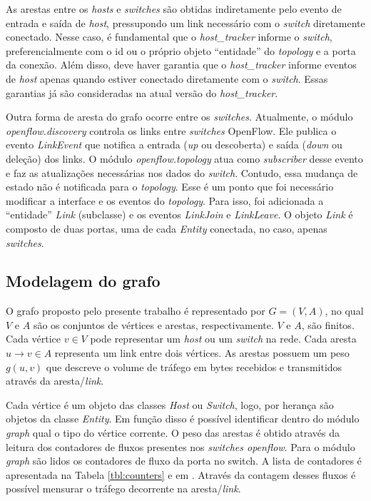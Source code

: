 As arestas entre os \emph{hosts} e \emph{switches} são obtidas
indiretamente pelo evento de entrada e saída de \emph{host},
pressupondo um link necessário com o \emph{switch} diretamente conectado.
Nesse caso, é fundamental que o \emph{host\_tracker} informe 
o \emph{switch}, preferencialmente com o id 
ou o próprio objeto ``entidade'' do \emph{topology} e a porta da conexão.
Além disso, deve haver garantia que o \emph{host\_tracker} 
informe eventos de \emph{host} apenas quando estiver conectado
diretamente com o \emph{switch}.
Essas garantias já são consideradas na atual versão do \emph{host\_tracker}.

Outra forma de aresta do grafo ocorre entre os \emph{switches}.
Atualmente, o módulo \emph{openflow.discovery} controla os 
links entre \emph{switches} OpenFlow. 
Ele publica o evento \emph{LinkEvent} que notifica 
a entrada ({\it up} ou descoberta) e saída ({\it down} ou deleção)
dos links.
O módulo \emph{openflow.topology} atua como {\it subscriber} desse evento
e faz as atualizações necessárias nos dados do \emph{switch}.
Contudo, essa mudança de estado não é notificada para o \emph{topology}.
Esse é um ponto que foi necessário modificar a interface e os
eventos do \emph{topology}.
Para isso, foi adicionada a ``entidade'' \emph{Link} (subclasse) e
os eventos \emph{LinkJoin} e \emph{LinkLeave}.
O objeto \emph{Link} é composto de duas portas,
uma de cada \emph{Entity} conectada,
no caso, apenas \emph{switches}.


\subsection{Modelagem do grafo}
O grafo proposto pelo presente trabalho é representado por
$G=(V,A)$, no qual $V$ e $A$ são os conjuntos de vértices e arestas, respectivamente. 
 $V$ e $A$, são finitos.
Cada vértice $v \in V$ pode representar um \emph{host} ou um
\emph{switch} na rede. 
Cada aresta $u \to v \in A$ representa um link entre dois vértices.
As arestas possuem um peso $g(u, v)$ que descreve o volume de 
tráfego em bytes recebidos e transmitidos através da aresta/\emph{link}. 

Cada vértice é um objeto das classes \emph{Host} ou \emph{Switch},
logo, por herança são objetos da classe \emph{Entity}. 
Em função disso é possível identificar dentro do módulo 
\emph{graph} qual o tipo do vértice corrente. 
O peso das arestas é obtido através da leitura dos contadores 
de fluxos presentes nos \emph{switches openflow}.
Para o módulo \emph{graph} são lidos os contadores de fluxo da porta 
no switch. 
A lista de contadores é apresentada na Tabela \ref{tbl:counters} e em 
\citep{openflow2013protocol}.
Através da contagem desses fluxos é possível mensurar o tráfego 
decorrente na aresta/\emph{link}.

